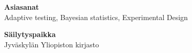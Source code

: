 \documentclass[]{scrartcl}
\begin{document}
\vspace{-0.25cm}

\begin{tcolorbox}
	\textbf{Asiasanat}\\
	Adaptive testing, Bayesian statistics, Experimental Design
\end{tcolorbox}

\vspace{-0.5cm}

\begin{tcolorbox}
	\textbf{Säilytyspaikka}\\
	Jyväskylän Yliopiston kirjasto
\end{tcolorbox}


\newpage

\tableofcontents








\end{document}
